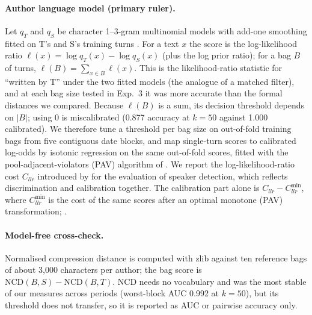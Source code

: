 \paragraph{Author language model (primary ruler).}
Let $q_T$ and $q_S$ be character 1--3-gram multinomial models with add-one smoothing fitted on T's and S's training turns \citep[cf.][]{peng2003language}.
For a text $x$ the score is the log-likelihood ratio $\ell(x) = \log q_T(x) - \log q_S(x)$ (plus the log prior ratio); for a bag $B$ of turns, $\ell(B) = \sum_{x \in B} \ell(x)$.
This is the likelihood-ratio statistic for ``written by T'' under the two fitted models (the analogue of a matched filter), and at each bag size tested in Exp.~3 it was more accurate than the formal distances we compared.
Because $\ell(B)$ is a sum, its decision threshold depends on $|B|$; using 0 is miscalibrated (0.877 accuracy at $k = 50$ against 1.000 calibrated).
We therefore tune a threshold per bag size on out-of-fold training bags from five contiguous date blocks, and map single-turn scores to calibrated log-odds by isotonic regression on the same out-of-fold scores, fitted with the pool-adjacent-violators (PAV) algorithm of \citet{ayer1955empirical}.
We report the log-likelihood-ratio cost $C_{llr}$ introduced by \citet{brummer2006application} for the evaluation of speaker detection, which reflects discrimination and calibration together.
The calibration part alone is $C_{llr} - C_{llr}^{\min}$, where $C_{llr}^{\min}$ is the cost of the same scores after an optimal monotone (PAV) transformation; .

\paragraph{Model-free cross-check.}
Normalised compression distance \citep[NCD;][]{cilibrasi2005clustering} is computed with zlib against ten reference bags of about 3,000 characters per author; the bag score is $\mathrm{NCD}(B, S) - \mathrm{NCD}(B, T)$.
NCD needs no vocabulary and was the most stable of our measures across periods (worst-block AUC 0.992 at $k = 50$), but its threshold does not transfer, so it is reported as AUC or pairwise accuracy only.

